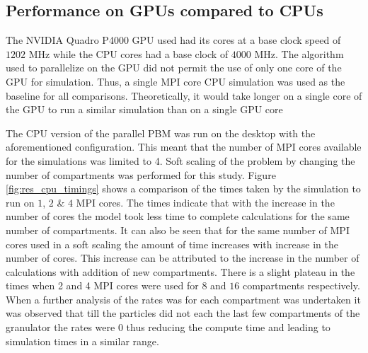 \documentclass[preprint,10pt,authoryear,review]{elsarticle}
\begin{document}
\begin{linenumbers}
\subsection{Performance on GPUs compared to CPUs}
The NVIDIA Quadro P4000 GPU used had its cores at a base clock speed of $1202$ MHz while
the CPU cores had a base clock of $4000$ MHz. The algorithm used to parallelize on the GPU 
did not permit the use of only one core of the GPU for simulation. Thus, a single MPI core 
CPU simulation was used as the baseline for all comparisons. Theoretically, it would take 
longer on a single core of the GPU to run a similar simulation than on a single GPU core

The CPU version of the parallel PBM was run on the desktop with the aforementioned 
configuration. This meant that the number of MPI cores available for the simulations 
was limited to 4. Soft scaling of the problem by changing the number of compartments 
was performed for this study. Figure \ref{fig:res_cpu_timings} shows a comparison of the times taken 
by the simulation to run on $1$, $2$ \& $4$ MPI cores. The times indicate that 
with the increase in the number of cores the model took less time to complete 
calculations for the same number of compartments. It can also be seen that for the 
same number of MPI cores used in a soft scaling the amount of time increases 
with increase in the number of cores. This increase can be attributed to the 
increase in the number of calculations with addition of new compartments. There is a 
slight plateau in the times when 2 and 4 MPI cores were used for $8$ and $16$ compartments 
respectively. When a further analysis of the rates was for each compartment was undertaken 
it was observed that till the particles did not each the last few compartments of the 
granulator the rates were $0$ thus reducing the compute time and leading to simulation
times in a similar range. 


\end{linenumbers}
\end{document}
